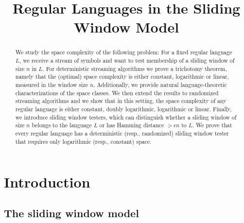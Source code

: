 \documentclass{theoretics}
\title{Regular Languages in the Sliding Window Model}
\begin{document}
\maketitle

\begin{abstract}
We study the space complexity of the following problem:
For a fixed regular language $L$, we receive a stream of symbols and want to test membership of a sliding window of size $n$ in $L$.
For deterministic streaming algorithms we prove a trichotomy theorem,
namely that the (optimal) space complexity is either constant, logarithmic or linear,
measured in the window size $n$.
Additionally, we provide natural language-theoretic characterizations
of the space classes.
We then extend the results to randomized streaming algorithms and we show that in this setting, the space complexity of any regular language is either constant, doubly logarithmic, logarithmic or linear.
Finally, we introduce sliding window testers, which can distinguish
whether a sliding window of size $n$ belongs to the language $L$ or
has Hamming distance $> \epsilon n$ to $L$.
We prove that every regular language has a deterministic (resp., randomized) sliding window tester
that requires only logarithmic (resp., constant) space.
\end{abstract}






\section{Introduction}

\subsection{The sliding window model}
\end{document}
